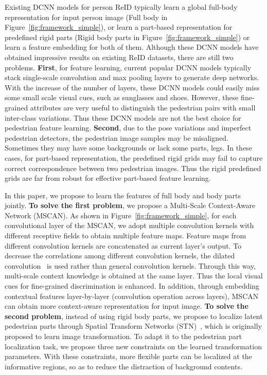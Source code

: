 \documentclass[10pt,twocolumn,letterpaper]{article}
\begin{document}
Existing DCNN models for person ReID typically learn a global full-body representation for input person image (Full body in Figure~\ref{fig:framework_simple}),
or learn a part-based representation for predefined rigid parts (Rigid body parts in Figure~\ref{fig:framework_simple})
or learn a feature embedding for both of them.
Although these DCNN models have obtained impressive results on existing ReID datasets, there are still two problems.
\textbf{First}, for feature learning, current popular DCNN models typically stack single-scale convolution and max pooling layers to generate deep networks.
With the increase of the number of layers, these DCNN models could easily miss some small scale visual cues, such as sunglasses and shoes.
However, these fine-grained attributes are very useful to distinguish the pedestrian pairs with small inter-class variations.
Thus these DCNN models are not the best choice for pedestrian feature learning.
\textbf{Second}, due to the pose variations and imperfect pedestrian detectors, the pedestrian image samples may be misaligned.
Sometimes they may have some backgrounds or lack some parts, \eg legs.
In these cases, for part-based representation, the predefined rigid grids may fail to capture correct correspondence between two pedestrian images.
Thus the rigid predefined grids are far from robust for effective part-based feature learning.

In this paper, we propose to learn the features of full body and body parts jointly.
\textbf{To solve the first problem}, we propose a Multi-Scale Context-Aware Network (MSCAN).
As shown in Figure~\ref{fig:framework_simple}, for each convolutional layer of the MSCAN,
we adopt multiple convolution kernels with different receptive fields to obtain multiple feature maps.
Feature maps from different convolution kernels are concatenated as current layer's output.
To decrease the correlations among different convolution kernels, the dilated convolution~\cite{YuKoltun2016} is used rather than general convolution kernels.
Through this way, multi-scale context knowledge is obtained at the same layer.
Thus the local visual cues for fine-grained discrimination is enhanced.
In addition, through embedding contextual features layer-by-layer (convolution operation across layers),
MSCAN can obtain more context-aware representation for input image.
\textbf{To solve the second problem}, instead of using rigid body parts, we propose to localize latent pedestrian parts through
Spatial Transform Networks (STN)~\cite{JaderbergNIPS15spatial}, which is originally proposed to learn image transformation.
To adapt it to the pedestrian part localization task, we propose three new constraints on the learned transformation parameters.
With these constraints, more flexible parts can be localized at the informative regions, so as to reduce the distraction of background contents.
\end{document}

